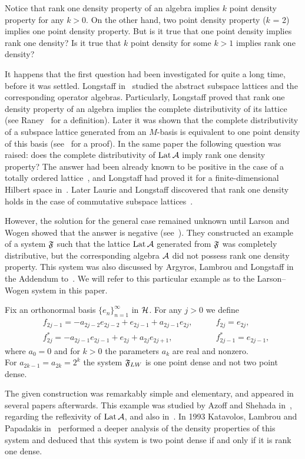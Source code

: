 \documentclass[12pt,oneside,a4paper]{amsart}
\begin{document}
  Notice that rank one density property of an algebra implies $k$ point density property for any $k > 0$.
  On the other hand, two point density property ($k$ = 2) implies one point density property.
  But is it true that one point density implies rank one density?
  Is it true that $k$ point density for some $k > 1$ implies rank one density?

  It happens that the first question had been investigated for quite a long time, before it was settled.
  Long\-staff in~\cite{longstaff} studied the abstract subspace lattices and the corresponding operator algebras.
  Particularly, Longstaff proved that rank one density property of an algebra implies
    the complete distributivity of its lattice (see Raney~\cite{raney} for a definition).
  Later it was shown that the complete distributivity of a subspace lattice generated from an $M$-basis
    is equivalent to one point density of this basis (see~\cite{argyroslambrou} for a proof).
  In the same paper the following question was raised: does the complete distributivity of $\lattice$ imply rank one density property?
  The answer had been already known to be positive in the case of a totally ordered lattice~\cite{erdos}, and
    Longstaff had proved it for a finite-dimensional Hilbert space in~\cite{longstaff}.
  Later Laurie and Longstaff discovered that rank one density holds in the case of commutative subspace lattices~\cite{laurielongstaff}.

  However, the solution for the general case remained unknown until Larson and Wogen showed that the answer is negative (see~\cite{larson}).
  They constructed an example of a system $\fsys$ such that the lattice $\lattice$ generated from $\fsys$
    was completely distributive, but the corresponding algebra $\cal{A}$
    did not possess rank one density property.
  This system was also discussed by Argyros, Lambrou and Longstaff in the Addendum to~\cite{argyroslambrou}.
  We will refer to this particular example as to the Larson--Wogen system in this paper.
  \begin{example}
    \label{lw-sys}
    Fix an orthonormal basis $\{e_n\}_{n=1}^\infty$ in $\cal{H}$. For any $j > 0$ we define
    \begin{align*}
      &f_{2j-1}=-a_{2j-2}e_{2j-2} + e_{2j-1} + a_{2j-1}e_{2j}, \qquad &f_{2j}=e_{2j},\\
      &f^*_{2j}=-a_{2j-1}e_{2j-1}+e_{2j}+a_{2j}e_{2j+1}, \qquad &f^*_{2j-1}=e_{2j-1},
    \end{align*}
    where $a_0 = 0$ and for $k > 0$ the parameters $a_k$ are real and nonzero.\\
    For $a_{2k-1}= a_{2k} = 2^k$ the system $\fsys_{LW}$ is one point dense and not two point dense.
  \end{example}
  The given construction was remarkably simple and elementary, and appeared in several papers afterwards.
  This example was studied by Azoff and Shehada in~\cite{azoff}, regarding the reflexivity of $\lattice$, and also in~\cite{me}.
  In 1993 Katavolos, Lambrou and Papadakis in~\cite{katavolos} performed a deeper analysis of the density properties
    of this system and deduced that this system is two point dense if and only if it is rank one dense.
\end{document}
